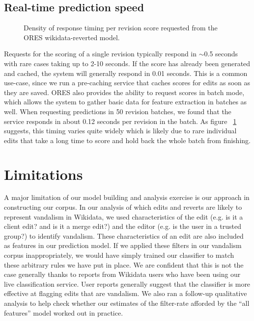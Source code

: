 \documentclass{sig-alternate-2013}
\begin{document}
\subsection{Real-time prediction speed}
\begin{figure}
\centering
{}
\caption{Density of response timing per revision score requested from the ORES wikidata-reverted model.}
\label{fig:ores_response}
\end{figure}
Requests for the scoring of a single revision typically respond in $\sim$0.5 seconds with rare cases taking up to 2-10 seconds.  If the score has already been generated and cached, the system will generally respond in 0.01 seconds.  This is a common use-case, since we run a pre-caching service that caches scores for edits as soon as they are saved.  ORES also provides the ability to request scores in batch mode, which allows the system to gather basic data for feature extraction in batches as well.  When requesting predictions in 50 revision batches, we found that the service responds in about 0.12 seconds per revision in the batch.  As figure ~\ref{fig:ores_response} suggests, this timing varies quite widely which is likely due to rare individual edits that take a long time to score and hold back the whole batch from finishing.

\section{Limitations}

A major limitation of our model building and analysis exercise is our approach in constructing our corpus. In our analysis of which edits and reverts are likely to represent vandalism in Wikidata, we used characteristics of the edit (e.g. is it a client edit? and is it a merge edit?) and the editor (e.g. is the user in a trusted group?) to identify vandalism. These characteristics of an edit are also included as features in our prediction model. If we applied these filters in our vandalism corpus inappropriately, we would have simply trained our classifier to match these arbitrary rules we have put in place. We are confident that this is not the case generally thanks to reports from Wikidata users who have been using our live classification service. User reports generally suggest that the classifier is more effective at flagging edits that are vandalism. We also ran a follow-up qualitative analysis to help check whether our estimates of the filter-rate afforded by the ``all features'' model worked out in practice.
\end{document}
